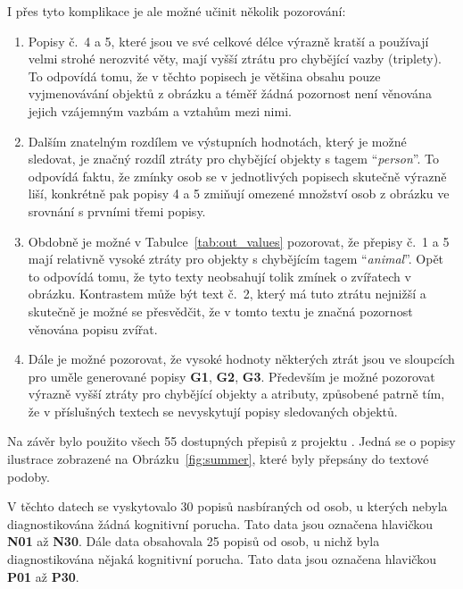 I přes tyto komplikace je ale možné učinit několik pozorování:
\begin{enumerate}
	\item Popisy č.~4 a 5, které jsou ve své celkové délce výrazně kratší a používají velmi strohé nerozvité věty, mají vyšší ztrátu pro chybějící vazby (triplety).
	      To odpovídá tomu, že v těchto popisech je většina obsahu pouze vyjmenovávání objektů z obrázku a téměř žádná pozornost není věnována
	      jejich vzájemným vazbám a vztahům mezi nimi.
	\item Dalším znatelným rozdílem ve výstupních hodnotách, který je možné sledovat, je značný rozdíl ztráty pro chybějící objekty s tagem \enquote{\emph{person}}.
	      To odpovídá faktu, že zmínky osob se v jednotlivých popisech skutečně výrazně liší, konkrétně pak popisy 4 a 5 zmiňují omezené množství osob z obrázku ve srovnání s prvními třemi popisy.
	\item Obdobně je možné v Tabulce~\ref{tab:out_values} pozorovat, že přepisy č.~1 a 5 mají relativně vysoké ztráty pro objekty s chybějícím tagem \enquote{\emph{animal}}.
	      Opět to odpovídá tomu, že tyto texty neobsahují tolik zmínek o zvířatech v obrázku.
	      Kontrastem může být text č.~2, který má tuto ztrátu nejnižší a skutečně je možné se přesvědčit, že v tomto textu je značná pozornost věnována popisu zvířat.
	\item Dále je možné pozorovat, že vysoké hodnoty některých ztrát jsou ve sloupcích pro uměle generované popisy \textbf{G1}, \textbf{G2}, \textbf{G3}.
	      Především je možné pozorovat výrazně vyšší ztráty pro chybějící objekty a atributy, způsobené patrně tím, že
	      v příslušných textech se nevyskytují popisy sledovaných objektů.
\end{enumerate}



\clearpage
Na závěr bylo použito všech 55 dostupných přepisů z projektu \projekt{}.
Jedná se o popisy ilustrace zobrazené na Obrázku~\ref{fig:summer}, které byly přepsány do textové podoby.

V těchto datech se vyskytovalo 30 popisů nasbíraných od osob, u kterých nebyla diagnostikována žádná kognitivní porucha.
Tato data jsou označena hlavičkou \textbf{N01} až \textbf{N30}.
Dále data obsahovala 25 popisů od osob, u nichž byla diagnostikována nějaká kognitivní porucha.
Tato data jsou označena hlavičkou \textbf{P01} až \textbf{P30}.

